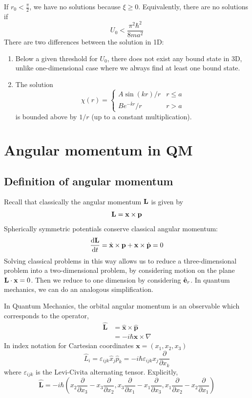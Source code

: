 \documentclass[a4paper]{article}
\begin{document}
If \( r_0 < \frac{\pi}{2} \), we have no solutions because \( \xi \geq 0 \).
Equivalently, there are no solutions if
\[
	U_0 < \frac{\pi^2 \hbar^2}{8ma^2}
\]
There are two differences between the solution in 1D: 
\begin{enumerate}
	\item Below a given threshold for $U_0$, there does not exist any bound state in 3D, unlike one-dimensional case where we always ﬁnd at least one bound state. 
	\item The solution 
	\[
		\chi(r) = \begin{cases}
			A \sin(kr)/r           & r \leq a \\
			B e^{-\overline k r}/r & r > a
		\end{cases}
	\]
	is bounded above by $ 1/r $ (up to a constant multiplication). 
\end{enumerate}

\section{Angular momentum in QM}
\subsection{Definition of angular momentum}
Recall that classically the angular momentum \( {\bf L} \) is given by
\[
	{\bf L} = {\bf x} \times {\bf p}
\]
Spherically symmetric potentials conserve classical angular momentum:
\[
	\dv{{\bf L}}{t} = \dot {{\bf x}} \times {\bf p} + {\bf x} \times \dot {{\bf p}} = 0
\]
Solving classical problems in this way allows us to reduce a three-dimensional problem into a two-dimensional problem, by considering motion on the plane \( {\bf L} \cdot {\bf x} = 0 \).
Then we reduce to one dimension by considering \( \hat {{\bf e}}_r \).
In quantum mechanics, we can do an analogous simplification.

\begin{definition}
	In Quantum Mechanics, the orbital angular momentum is an observable which corresponds to the operator,
	\[
	\begin{aligned}
	\hat{\mathbf{L}} &=\hat{\mathbf{x}} \times \hat{\mathbf{p}} \\
	&=-i \hbar \mathbf{x} \times \nabla
	\end{aligned}
	\]
	In index notation for Cartesian coordinates $\mathbf{x}=\left(x_1, x_2, x_3\right)$
	\[
	\hat{L}_i=\varepsilon_{i j k} \hat{x}_j \hat{p}_k=-i \hbar \varepsilon_{i j k} x_j \frac{\partial}{\partial x_k}
	\]
	where $\varepsilon_{i j k}$ is the Levi-Civita alternating tensor. Explicitly,
	\[
	\hat{\mathbf{L}}=-i \hbar\left(x_2 \frac{\partial}{\partial x_3}-x_3 \frac{\partial}{\partial x_2}, x_3 \frac{\partial}{\partial x_1}-x_1 \frac{\partial}{\partial x_3}, x_1 \frac{\partial}{\partial x_2}-x_2 \frac{\partial}{\partial x_1}\right)
	\]
\end{definition}
\end{document}
